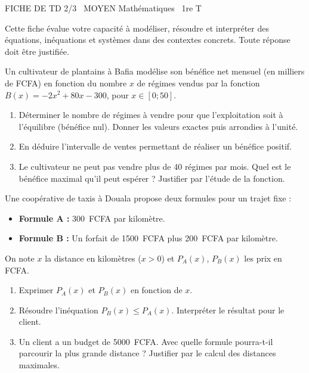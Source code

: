 \documentclass[11pt]{article}
\begin{document}
\begin{tcolorbox}[enhanced,colback=popink,colframe=popink,arc=10pt,boxrule=0pt,left=12pt,right=12pt,top=9pt,bottom=9pt]
{\color{white}\popxbold\small FICHE DE TD 2/3 \textbullet\ MOYEN \hfill Mathématiques \textbullet\ 1re T\par}
\end{tcolorbox}
\vspace{4pt}
Cette fiche évalue votre capacité à modéliser, résoudre et interpréter des équations, inéquations et systèmes dans des contextes concrets. Toute réponse doit être justifiée.

\begin{exercice}
Un cultivateur de plantains à Bafia modélise son bénéfice net mensuel (en milliers de FCFA) en fonction du nombre $x$ de régimes vendus par la fonction $B(x) = -2x^2 + 80x - 300$, pour $x \in [0; 50]$.
\begin{enumerate}
    \item Déterminer le nombre de régimes à vendre pour que l'exploitation soit à l'équilibre (bénéfice nul). Donner les valeurs exactes puis arrondies à l'unité.
    \item En déduire l'intervalle de ventes permettant de réaliser un bénéfice positif.
    \item Le cultivateur ne peut pas vendre plus de 40 régimes par mois. Quel est le bénéfice maximal qu'il peut espérer ? Justifier par l'étude de la fonction.
\end{enumerate}
\end{exercice}

\begin{exercice}
Une coopérative de taxis à Douala propose deux formules pour un trajet fixe :
\begin{itemize}
    \item \textbf{Formule A :} \SI{300}{FCFA} par kilomètre.
    \item \textbf{Formule B :} Un forfait de \SI{1500}{FCFA} plus \SI{200}{FCFA} par kilomètre.
\end{itemize}
On note $x$ la distance en kilomètres ($x > 0$) et $P_A(x)$, $P_B(x)$ les prix en FCFA.
\begin{enumerate}
    \item Exprimer $P_A(x)$ et $P_B(x)$ en fonction de $x$.
    \item Résoudre l'inéquation $P_B(x) \le P_A(x)$. Interpréter le résultat pour le client.
    \item Un client a un budget de \SI{5000}{FCFA}. Avec quelle formule pourra-t-il parcourir la plus grande distance ? Justifier par le calcul des distances maximales.
\end{enumerate}
\end{exercice}
\end{document}
